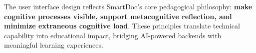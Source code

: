 \medskip
The user interface design reflects SmartDoc's core pedagogical philosophy: \textbf{make cognitive processes visible, support metacognitive reflection, and minimize extraneous cognitive load}. These principles translate technical capability into educational impact, bridging AI-powered backends with meaningful learning experiences.